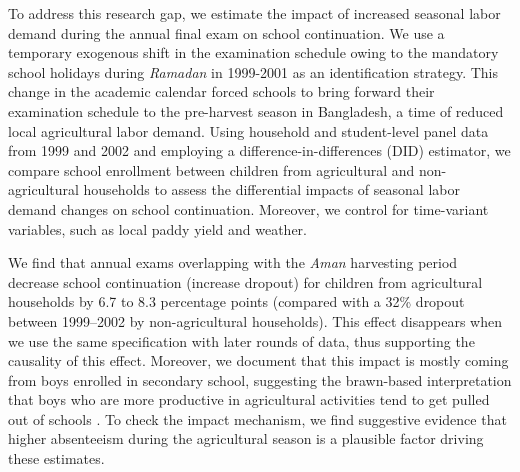 \documentclass[12pt,letterpaper]{article}
\newcommand{\0}{\ensuremath{\mbox{\boldmath $0$}}}
\begin{document}


To address this research gap, we estimate the impact of increased seasonal labor demand during the annual final exam on school continuation. We use a temporary exogenous shift in the examination schedule owing to the mandatory school holidays during \textit{Ramadan} in 1999-2001 as an identification strategy. This change in the academic calendar forced schools to bring forward their examination schedule to the pre-harvest season in Bangladesh, a time of reduced local agricultural labor demand. Using household and student-level panel data from 1999 and 2002 and employing a difference-in-differences (DID) estimator, we compare school enrollment between children from agricultural and non-agricultural households to assess the differential impacts of seasonal labor demand changes on school continuation. Moreover, we control for time-variant variables, such as local paddy yield and weather. 

We find that annual exams overlapping with the \textit{Aman} harvesting period decrease school continuation (increase dropout) for children from agricultural households by 6.7 to 8.3 percentage points (compared with a 32\% dropout between 1999–2002 by non-agricultural households). This effect disappears when we use the same specification with later rounds of data, thus supporting the causality of this effect. Moreover, we document that this impact is mostly coming from boys enrolled in secondary school, suggesting the brawn-based interpretation that boys who are more productive in agricultural activities tend to get pulled out of schools \citep{PittRosenzweigHassan2010}. To check the impact mechanism, we find suggestive evidence that higher absenteeism during the agricultural season is a plausible factor driving these estimates.    
\end{document}

